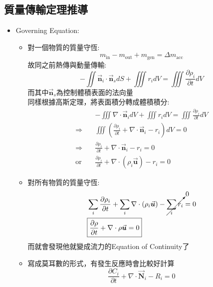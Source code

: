 \documentclass[../main.tex]{subfiles}
\begin{document}
\subsection{質量傳輸定理推導}
\begin{itemize}
\item Governing Equation:
  \begin{itemize}
    \item 對一個物質的質量守恆:
    \begin{equation}
      m_{\text{in}} - m_{\text{out}} + m_{\text{gen}} = \Delta m_{\text{acc}} \label{eq:mass_conservation_general}
    \end{equation}
    故同之前熱傳與動量傳輸:
    \begin{equation}
      -\iint \vec{\bm n}_i \cdot \vec{\bm n}_sdS + \iiint r_i dV = \iiint \frac{\partial \rho_i}{\partial t} dV \label{eq:mass_conservation_integral}
    \end{equation}
    而其中$\vec{\bm n}_s$為控制體積表面的法向量\\
    同樣根據高斯定理，將表面積分轉成體積積分:
    \begin{align}
      & - \iiint \nabla \cdot \vec{\bm n}_i dV + \iiint r_i dV = \iiint \frac{\partial \rho_i}{\partial t} dV \nonumber\\ 
      \Rightarrow \quad & \iiint\left(
        \frac{\partial \rho_i}{\partial t} + \nabla \cdot \vec{\bm n}_i - r_i
      \right) dV = 0 \nonumber\\
      \Rightarrow \quad & \boxed{\frac{\partial \rho_i}{\partial t} + \nabla \cdot \vec{\bm n}_i  -r_i = 0} \\
      \text{or} \quad & \boxed{\frac{\partial \rho_i}{\partial t} + \nabla \cdot (\rho_i \vec{\bm u}) - r_i = 0} \label{eq:mass_conservation_differential}
    \end{align}
    \item 對所有物質的質量守恆:
    \begin{align}
      &\sum_i \frac{\partial \rho_i}{\partial t} + \sum_i\nabla \cdot (\rho_i \vec{\bm u}) - \cancelto{0}{\sum_i r_i} = 0 \nonumber\\
      &\boxed{\frac{\partial \rho}{\partial t}+ \nabla \cdot \rho \vec{\bm u}=0} \label{eq:total_mass_conservation}
    \end{align}
    而就會發現他就變成流力的Equation of Continuity了
    \item 寫成莫耳數的形式，有發生反應時會比較好計算
    \begin{equation}
      \frac{\partial C_i}{\partial t} + \nabla \cdot \vec{\bm N}_i - R_i = 0 \label{eq:molar_mass_conservation}

\end{equation}
\end{itemize}
\end{itemize}
\end{document}
